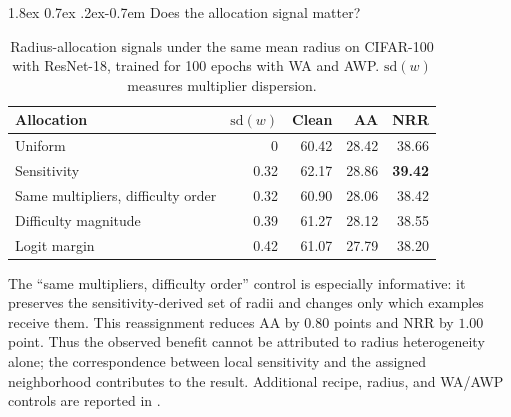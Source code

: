 \documentclass{article} %
\makeatletter
\theoremstyle{plain}
\renewcommand{\paragraph}{\@startsection{paragraph}{4}{\z@}%
  {1.8ex \@plus 0.7ex \@minus .2ex}{-0.7em}%
  {\normalfont\normalsize\bfseries}}
\makeatother
\begin{document}
\paragraph{Does the allocation signal matter?}
\begin{table}[!htbp]
  \centering
  \small
  \setlength{\tabcolsep}{4.5pt}
  \caption{
  Radius-allocation signals under the same mean radius on CIFAR-100 with
  ResNet-18, trained for 100 epochs with WA and AWP.
  \(\mathrm{sd}(w)\) measures multiplier dispersion.
  }
  \label{tab:allocation}
  \begin{tabular}{lrrrr}
    \toprule
    Allocation & \(\mathrm{sd}(w)\) & Clean & AA & NRR \\
    \midrule
    Uniform
      & 0 & 60.42 & 28.42 & 38.66 \\
    Sensitivity
      & 0.32 & 62.17 & 28.86 & \textbf{39.42} \\
    Same multipliers, difficulty order
      & 0.32 & 60.90 & 28.06 & 38.42 \\
    Difficulty magnitude
      & 0.39 & 61.27 & 28.12 & 38.55 \\
    Logit margin
      & 0.42 & 61.07 & 27.79 & 38.20 \\
    \bottomrule
  \end{tabular}
\end{table}

The ``same multipliers, difficulty order'' control is especially informative:
it preserves the sensitivity-derived set of radii and changes only which
examples receive them. This reassignment reduces AA by \(0.80\) points and
NRR by \(1.00\) point. Thus the observed benefit cannot be attributed to
radius heterogeneity alone; the correspondence between local sensitivity and
the assigned neighborhood contributes to the result. Additional recipe,
radius, and WA/AWP controls are reported
in .
\end{document}
